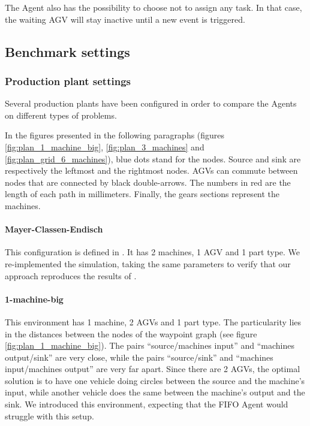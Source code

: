 \documentclass[sn-mathphys]{sn-jnl}
\begin{document}
The Agent also has the possibility to choose not to assign any task. In that case, the waiting AGV will stay inactive until a new event is triggered.

\subsection{Benchmark settings}

\subsubsection{Production plant settings}

Several production plants have been configured in order to compare the Agents on different types of problems.

In the figures presented in the following paragraphs (figures \ref{fig:plan_1_machine_big}, \ref{fig:plan_3_machines} and \ref{fig:plan_grid_6_machines}), blue dots stand for the nodes. Source and sink are respectively the leftmost and the rightmost nodes. AGVs can commute between nodes that are connected by black double-arrows. The numbers in red are the length of each path in millimeters. Finally, the gears sections represent the machines.

\paragraph{Mayer-Classen-Endisch}

This configuration is defined in \cite{Mayer2021}. It has 2 machines, 1 AGV and 1 part type. We re-implemented the simulation, taking the same parameters to verify that our approach reproduces the results of \cite{Mayer2021}.

\paragraph{1-machine-big}

This environment has 1 machine, 2 AGVs and 1 part type. The particularity lies in the distances between the nodes of the waypoint graph (see figure \ref{fig:plan_1_machine_big}). The pairs “source/machines input” and “machines output/sink” are very close, while the pairs “source/sink” and “machines input/machines output” are very far apart. Since there are 2 AGVs, the optimal solution is to have one vehicle doing circles between the source and the machine's input, while another vehicle does the same between the machine's output and the sink. We introduced this environment, expecting that the FIFO Agent would struggle with this setup.
\end{document}
